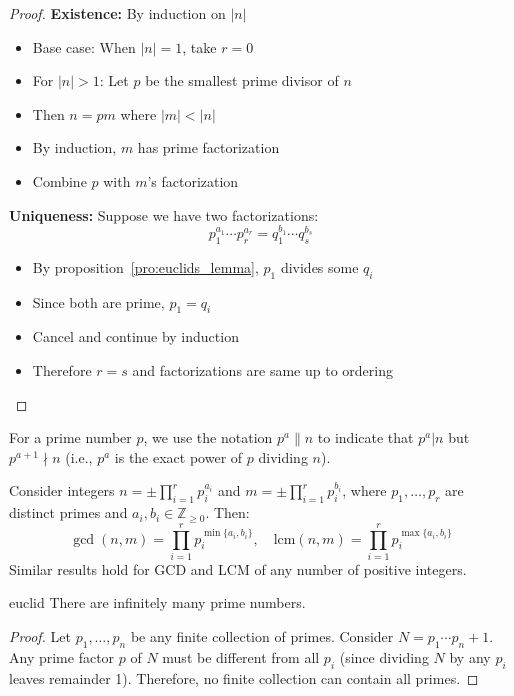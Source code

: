 \documentclass[11pt,lang=en]{elegantbook}
\begin{document}
\begin{proof}
  \textbf{Existence:} By induction on $|n|$
  \begin{itemize}
    \item Base case: When $|n|=1$, take $r=0$
    \item For $|n|>1$: Let $p$ be the smallest prime divisor of $n$
    \item Then $n = pm$ where $|m| < |n|$
    \item By induction, $m$ has prime factorization
    \item Combine $p$ with $m$'s factorization
  \end{itemize}

  \textbf{Uniqueness:} Suppose we have two factorizations:
  \[
    p_1^{a_1}\cdots p_r^{a_r} = q_1^{b_1}\cdots q_s^{b_s}
  \]
  \begin{itemize}
    \item By proposition~\ref{pro:euclids_lemma}, $p_1$ divides some $q_i$
    \item Since both are prime, $p_1 = q_i$
    \item Cancel and continue by induction
    \item Therefore $r=s$ and factorizations are same up to ordering
  \end{itemize}
\end{proof}

\begin{remark}
  For a prime number $p$, we use the notation $p^a \parallel n$ to indicate that $p^a|n$ but $p^{a+1} \nmid n$ (i.e., $p^a$ is the exact power of $p$ dividing $n$).
\end{remark}

\begin{corollary}
  Consider integers $n = \pm \prod_{i=1}^r p_i^{a_i}$ and $m = \pm \prod_{i=1}^r p_i^{b_i}$, where $p_1,\ldots,p_r$ are distinct primes and $a_i,b_i \in \mathbb{Z}_{\geq 0}$. Then:
  \[
    \gcd(n,m) = \prod_{i=1}^r p_i^{\min\{a_i,b_i\}}, \quad \text{lcm}(n,m) = \prod_{i=1}^r p_i^{\max\{a_i,b_i\}}
  \]
  Similar results hold for GCD and LCM of any number of positive integers.
\end{corollary}

\begin{theorem}[Euclid]{euclid}
  There are infinitely many prime numbers.
\end{theorem}

\begin{proof}
  Let $p_1,\ldots,p_n$ be any finite collection of primes.
  Consider $N = p_1\cdots p_n + 1$.
  Any prime factor $p$ of $N$ must be different from all $p_i$ (since dividing $N$ by any $p_i$ leaves remainder 1).
  Therefore, no finite collection can contain all primes.
\end{proof}
\end{document}
